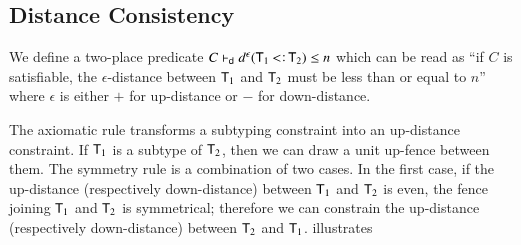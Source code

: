 \documentclass{report}
\begin{document}
  \subsection{Distance Consistency}
  We define a two-place predicate
  $C\entailsdc d^\epsilon(\type{T}_1\subtype\type{T}_2)\le n$ which can be
  read as ``if $C$ is satisfiable, the $\epsilon$-distance between $\textsf{T}_1$ and $\textsf{T}_2$
  must be less than or equal to $n$'' where $\epsilon$ is either $+$ for up-distance or $-$ for down-distance.
  The axiomatic rule \dcax transforms a subtyping constraint into an up-distance constraint.
  If $\textsf{T}_1$ is a subtype of $\textsf{T}_2$, then we can draw a unit up-fence between them.
  The symmetry rule \dcsymm is a combination of two cases. In the first case, if the up-distance
  (respectively down-distance) between $\textsf{T}_1$ and $\textsf{T}_2$ is even, the fence
  joining $\textsf{T}_1$ and $\textsf{T}_2$ is symmetrical; therefore we can constrain the up-distance
  (respectively down-distance) between $\textsf{T}_2$ and $\textsf{T}_1$.  illustrates
\end{document}

